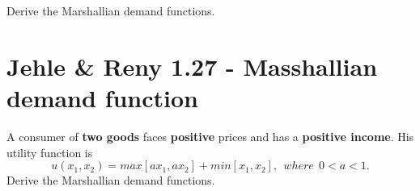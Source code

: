 \documentclass{article}
\begin{document}
Derive the Marshallian demand functions.

\section{Jehle \& Reny 1.27 - Masshallian demand function}

A consumer of \textbf{two goods} faces \textbf{positive} prices and has a \textbf{positive income}. 
His utility function is $$u(x_1, x_2) = max[ax_1, ax_2] + min[x_1, x_2], \ \ where \ \ 0 < a < 1.$$
Derive the Marshallian demand functions.
\end{document}
